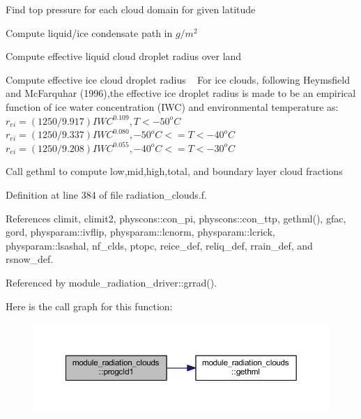 \begin{DoxyEnumerate}
\item Find top pressure for each cloud domain for given latitude
\item Compute liquid/ice condensate path in $ g/m^2 $
\item Compute effective liquid cloud droplet radius over land
\item Compute effective ice cloud droplet radius ~\newline
 For ice clouds, following Heymsfield and Mc\+Farquhar (1996),the effective ice droplet radius is made to be an empirical function of ice water concentration (I\+WC) and environmental temperature as\+: ~\newline
 $ r_{ei} = (1250/9.917)IWC^{0.109},T<-50^oC $ ~\newline
 $ r_{ei} = (1250/9.337)IWC^{0.080},-50^oC<=T<-40^oC $ ~\newline
 $ r_{ei} = (1250/9.208)IWC^{0.055},-40^oC<=T<-30^oC $ ~\newline

\item Call gethml to compute low,mid,high,total, and boundary layer cloud fractions 
\end{DoxyEnumerate}

Definition at line 384 of file radiation\+\_\+clouds.\+f.



References climit, climit2, physcons\+::con\+\_\+pi, physcons\+::con\+\_\+ttp, gethml(), gfac, gord, physparam\+::ivflip, physparam\+::lcnorm, physparam\+::lcrick, physparam\+::lsashal, nf\+\_\+clds, ptopc, reice\+\_\+def, reliq\+\_\+def, rrain\+\_\+def, and rsnow\+\_\+def.



Referenced by module\+\_\+radiation\+\_\+driver\+::grrad().



Here is the call graph for this function\+:
\nopagebreak
\begin{figure}[H]
\begin{center}
\leavevmode
\includegraphics[width=350pt]{namespacemodule__radiation__clouds_ab45374e1eeec7d6211284b38c3ec8448_cgraph}
\end{center}
\end{figure}




